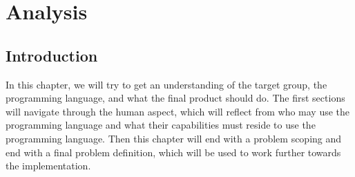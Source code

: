 \chapter{Analysis}\label{ch:ch2label}
\section{Introduction}
In this chapter, we will try to get an understanding of the target group, the programming language, and what the final product should do. The first sections will navigate through the human aspect, which will reflect from who may use the programming language and what their capabilities must reside to use the programming language. Then this chapter will end with a problem scoping and end with a final problem definition, which will be used to work further towards the implementation.